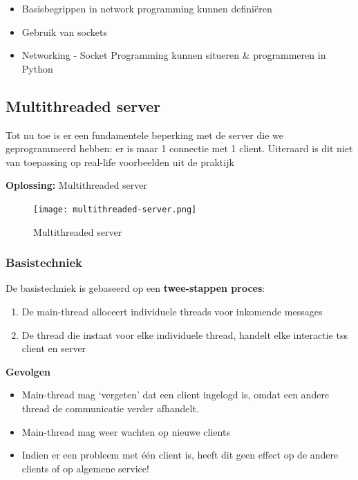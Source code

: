 \documentclass{article}
\begin{document}
\begin{itemize}
    \item Basisbegrippen in network programming kunnen definiëren
    \item Gebruik van sockets
    \item Networking - Socket Programming kunnen situeren \& programmeren in Python
\end{itemize}

\subsection{Multithreaded server}

Tot nu toe is er een fundamentele beperking met de server die we geprogrammeerd hebben:
er is maar 1 connectie met 1 client. Uiteraard is dit niet van toepassing op real-life voorbeelden uit de praktijk

\textbf{Oplossing:} Multithreaded server

\begin{figure}[H]
    \centering
    \texttt{[image: multithreaded-server.png]}
    \caption{Multithreaded server}
\end{figure}

\subsubsection{Basistechniek}

De basistechniek is gebaseerd op een \textbf{twee-stappen proces}:

\begin{enumerate}
    \item De main-thread alloceert individuele threads voor inkomende messages
    \item De thread die instaat voor elke individuele thread, handelt elke interactie tss client en server
\end{enumerate}

\textbf{Gevolgen}

\begin{itemize}
    \item Main-thread mag `vergeten' dat een client ingelogd is, omdat een andere thread de communicatie verder afhandelt.
    \item Main-thread mag weer wachten op nieuwe clients
    \item Indien er een probleem met één client is, heeft dit geen effect op de andere clients of op algemene service!
\end{itemize}
\end{document}
